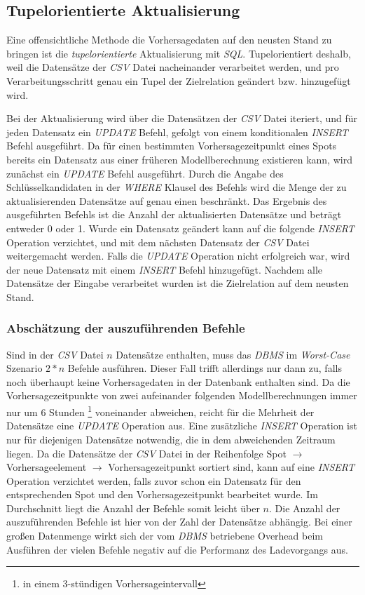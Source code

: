 \subsection{Tupelorientierte Aktualisierung}
Eine offensichtliche Methode die Vorhersagedaten auf den neusten Stand
zu bringen ist die \textit{tupelorientierte} Aktualisierung mit
\textit{SQL}. Tupelorientiert deshalb, weil die Datensätze der
\textit{CSV} Datei nacheinander verarbeitet werden, und pro
Verarbeitungsschritt genau ein Tupel der Zielrelation geändert
bzw. hinzugefügt wird. 

Bei der Aktualisierung wird über die Datensätzen der \textit{CSV}
Datei iteriert, und für jeden Datensatz ein \textit{UPDATE} Befehl,
gefolgt von einem konditionalen \textit{INSERT} Befehl ausgeführt. Da
für einen bestimmten Vorhersagezeitpunkt eines Spots bereits ein
Datensatz aus einer früheren Modellberechnung existieren kann, wird
zunächst ein \textit{UPDATE} Befehl ausgeführt. Durch die Angabe des
Schlüsselkandidaten in der \textit{WHERE} Klausel des Befehls wird die
Menge der zu aktualisierenden Datensätze auf genau einen
beschränkt. Das Ergebnis des ausgeführten Befehls ist die Anzahl der
aktualisierten Datensätze und beträgt entweder 0 oder 1. Wurde ein
Datensatz geändert kann auf die folgende \textit{INSERT} Operation
verzichtet, und mit dem nächsten Datensatz der \textit{CSV} Datei
weitergemacht werden. Falls die \textit{UPDATE} Operation nicht
erfolgreich war, wird der neue Datensatz mit einem \textit{INSERT}
Befehl hinzugefügt. Nachdem alle Datensätze der Eingabe verarbeitet
wurden ist die Zielrelation auf dem neusten Stand.

\subsubsection{Abschätzung der auszuführenden Befehle}
Sind in der \textit{CSV} Datei $n$ Datensätze enthalten, muss das
\textit{DBMS} im \textit{Worst-Case} Szenario $2 * n$ Befehle
ausführen. Dieser Fall trifft allerdings nur dann zu, falls noch
überhaupt keine Vorhersagedaten in der Datenbank enthalten sind. Da
die Vorhersagezeitpunkte von zwei aufeinander folgenden
Modellberechnungen immer nur um 6 Stunden \footnote{in einem
  3-stündigen Vorhersageintervall} voneinander abweichen, reicht für
die Mehrheit der Datensätze eine \textit{UPDATE} Operation aus. Eine
zusätzliche \textit{INSERT} Operation ist nur für diejenigen
Datensätze notwendig, die in dem abweichenden Zeitraum liegen. Da die
Datensätze der \textit{CSV} Datei in der Reihenfolge Spot
$\rightarrow$ Vorhersageelement $\rightarrow$ Vorhersagezeitpunkt
sortiert sind, kann auf eine \textit{INSERT} Operation verzichtet
werden, falls zuvor schon ein Datensatz für den entsprechenden Spot
und den Vorhersagezeitpunkt bearbeitet wurde. Im Durchschnitt liegt
die Anzahl der Befehle somit leicht über $n$. Die Anzahl der
auszuführenden Befehle ist hier von der Zahl der Datensätze
abhängig. Bei einer großen Datenmenge wirkt sich der vom \textit{DBMS}
betriebene Overhead beim Ausführen der vielen Befehle negativ auf die
Performanz des Ladevorgangs aus.

